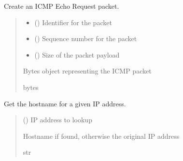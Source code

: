 \documentclass[letterpaper,10pt,english]{sphinxmanual}
\begin{document}
\begin{fulllineitems}
\label{\detokenize{utils:utils.create_packet}}
\pysigstartsignatures
\pysiglinewithargsret
{}
{\sphinxparamcomma {}\sphinxparamcomma {}}
{}
\pysigstopsignatures
\sphinxAtStartPar
Create an ICMP Echo Request packet.
\begin{quote}\begin{description}
\begin{itemize}
\item {} 
\sphinxAtStartPar
{} () \textendash{} Identifier for the packet

\item {} 
\sphinxAtStartPar
{} () \textendash{} Sequence number for the packet

\item {} 
\sphinxAtStartPar
{} () \textendash{} Size of the packet payload

\end{itemize}

\sphinxAtStartPar
Bytes object representing the ICMP packet

\sphinxAtStartPar
bytes

\end{description}\end{quote}

\end{fulllineitems}


\begin{fulllineitems}
\label{\detokenize{utils:utils.get_hostname}}
\pysigstartsignatures
\pysiglinewithargsret
{}
{}
{}
\pysigstopsignatures
\sphinxAtStartPar
Get the hostname for a given IP address.
\begin{quote}\begin{description}
\sphinxAtStartPar
{} () \textendash{} IP address to lookup

\sphinxAtStartPar
Hostname if found, otherwise the original IP address

\sphinxAtStartPar
str

\end{description}\end{quote}

\end{fulllineitems}
\end{document}
